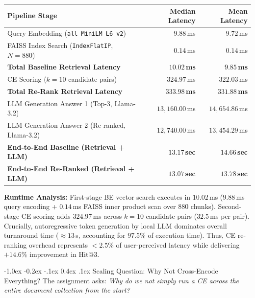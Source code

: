 \documentclass[11pt,a4paper]{article}
\makeatletter
\providecommand{\toprule}{\hline\hline}
\providecommand{\midrule}{\hline}
\providecommand{\bottomrule}{\hline\hline}
\newcommand{\captionof}[2]{%
  \def\@captype{#1}%
  \caption{#2}%
}
\renewcommand\section{\@startsection{section}{1}{\z@}%
  {-1.0ex \@plus -0.2ex \@minus -.1ex}%
  {0.4ex \@plus .1ex}%
  {\normalfont\large\bfseries\color{primaryblue}}}
\newenvironment{tightcenter}{%
  \setlength\topsep{1.2pt}%
  \setlength\parskip{0pt}%
  \begin{center}%
}{%
  \end{center}%
}
\makeatother
\begin{document}
\begin{tightcenter}
\small
\setlength{\tabcolsep}{5pt}
\renewcommand{\arraystretch}{0.92}
\begin{tabular}{lrr}
\toprule
\textbf{Pipeline Stage} & \textbf{Median Latency} & \textbf{Mean Latency} \\
\midrule
Query Embedding (\texttt{all-MiniLM-L6-v2}) & $9.88$\,ms & $9.72$\,ms \\
FAISS Index Search (\texttt{IndexFlatIP}, $N = 880$) & $0.14$\,ms & $0.14$\,ms \\
\textbf{Total Baseline Retrieval Latency} & $\mathbf{10.02}$\,\textbf{ms} & $\mathbf{9.85}$\,\textbf{ms} \\
\midrule
CE Scoring ($k = 10$ candidate pairs) & $324.97$\,ms & $322.03$\,ms \\
\textbf{Total Re-Rank Retrieval Latency} & $\mathbf{333.98}$\,\textbf{ms} & $\mathbf{331.88}$\,\textbf{ms} \\
\midrule
LLM Generation Answer 1 (Top-3, Llama-3.2) & $13,160.00$\,ms & $14,654.86$\,ms \\
LLM Generation Answer 2 (Re-ranked, Llama-3.2) & $12,740.00$\,ms & $13,454.29$\,ms \\
\midrule
\textbf{End-to-End Baseline (Retrieval + LLM)} & $\mathbf{13.17}$\,\textbf{sec} & $\mathbf{14.66}$\,\textbf{sec} \\
\textbf{End-to-End Re-Ranked (Retrieval + LLM)} & $\mathbf{13.07}$\,\textbf{sec} & $\mathbf{13.78}$\,\textbf{sec} \\
\bottomrule
\end{tabular}
\vspace{0.10em}
\captionof{table}{Stage-wise runtime profiling per query.}
\label{tab:latency_profile}
\end{tightcenter}

\textbf{Runtime Analysis:} First-stage BE vector search executes in $10.02$\,ms ($9.88$\,ms query encoding + $0.14$\,ms FAISS inner product scan over 880 chunks). Second-stage CE scoring adds $324.97$\,ms across $k=10$ candidate pairs ($32.5$\,ms per pair). Crucially, autoregressive token generation by local LLM dominates overall turnaround time ($\approx 13$\,s, accounting for $97.5\%$ of execution time). Thus, CE re-ranking overhead represents $< 2.5\%$ of user-perceived latency while delivering $+14.6\%$ improvement in Hit@3.

\section{Scaling Question: Why Not Cross-Encode Everything?}
\label{sec:scaling}
The assignment asks: \textit{Why do we not simply run a CE across the entire document collection from the start?}
\end{document}
